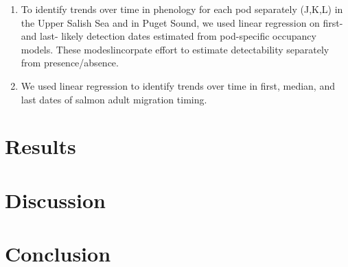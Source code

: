 \documentclass{article}
\begin{document}
\begin{enumerate}
\begin{enumerate}
\item To identify trends over time in phenology for each pod separately (J,K,L) in the Upper Salish Sea and in Puget Sound, we used linear regression on first- and last- likely detection dates estimated from pod-specific occupancy models. These modeslincorpate effort to estimate detectability separately from presence/absence.

\item We used linear regression to identify trends over time in first, median, and last dates of salmon adult migration timing.
\end{enumerate}
\end{enumerate}
\section*{Results}
\section*{Discussion}
\section*{Conclusion}


\end{document}
